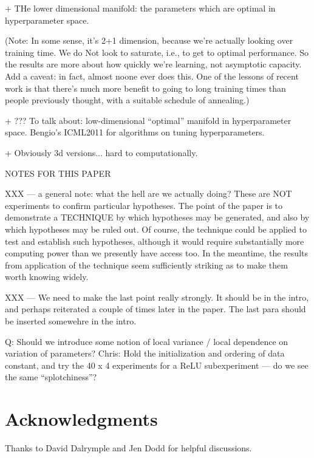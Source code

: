 \documentclass[10pt]{article}
\begin{document}
+ THe lower dimensional manifold: the parameters which are optimal in
hyperparameter space.


(Note: In some sense, it's 2+1 dimension, because we're actually
looking over training time.  We do Not look to saturate, i.e., to
get to optimal performance.  So the results are more about how quickly
we're learning, not asymptotic capacity.  Add a caveat: in fact,
almost noone ever does this.  One of the lessons of recent work is
that there's much more benefit to going to long training times than
people previously thought, with a suitable schedule of annealing.)


%


+ ??? To talk about: low-dimensional ``optimal'' manifold in
hyperparameter space.  Bengio's ICML2011 for algorithms on tuning
hyperparameters.

+ Obviously 3d versions... hard to computationally.


NOTES FOR THIS PAPER

XXX --- a general note: what the hell are we actually doing?  These
are NOT experiments to confirm particular hypotheses.  The point of
the paper is to demonstrate a TECHNIQUE by which hypotheses may be
generated, and also by which hypotheses may be ruled out.  Of course,
the technique could be applied to test and establish such hypotheses,
although it would require substantially more computing power than we
presently have access too.  In the meantime, the results from
application of the technique seem sufficiently striking as to make
them worth knowing widely.

XXX --- We need to make the last point really strongly.  It should be
in the intro, and perhaps reiterated a couple of times later in the
paper.  The last para should be inserted somewehre in the intro.


Q: Should we introduce some notion of local variance / local
dependence on variation of parameters?  Chris: Hold the initialization
and ordering of data constant, and try the 40 x 4 experiments for a
ReLU subexperiment --- do we see the same ``splotchiness''?

\section*{Acknowledgments}

Thanks to David Dalrymple and Jen Dodd for helpful discussions.
\end{document}
